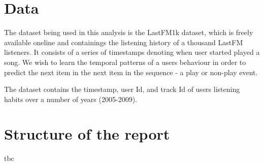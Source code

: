 \section{Data}

The dataset being used in this analysis is the LastFM1k dataset, which is freely available oneline and containings the listening history of a thousand LastFM listeners. It consists of a series of timestamps denoting when user started played a song. We wish to learn the temporal patterns of a users behaviour in order to predict the next item in the next item in the sequence - a play or non-play event. 

The dataset contains the timestamp, user Id, and track Id of users listening habits over a number of years (2005-2009).

\section{Structure of the report}
tbc
